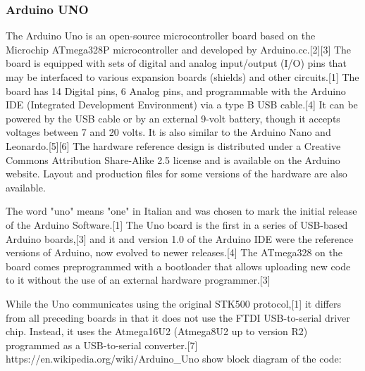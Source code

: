 \subsubsection{Arduino UNO}
The Arduino Uno is an open-source microcontroller board based on the Microchip ATmega328P 
microcontroller and developed by Arduino.cc.[2][3] The board is equipped with sets of digital 
and analog input/output (I/O) pins that may be interfaced to various expansion boards (shields) 
and other circuits.[1] The board has 14 Digital pins, 6 Analog pins, and programmable with 
the Arduino IDE (Integrated Development Environment) via a type B USB cable.[4] It can be 
powered by the USB cable or by an external 9-volt battery, though it accepts voltages between 
7 and 20 volts. It is also similar to the Arduino Nano and Leonardo.[5][6] The hardware 
reference design is distributed under a Creative Commons Attribution Share-Alike 2.5 license 
and is available on the Arduino website. Layout and production files for some versions of 
the hardware are also available.

The word "uno" means "one" in Italian and was chosen to mark the initial release of the 
Arduino Software.[1] The Uno board is the first in a series of USB-based Arduino boards,[3] 
and it and version 1.0 of the Arduino IDE were the reference versions of Arduino, now evolved 
to newer releases.[4] The ATmega328 on the board comes preprogrammed with a bootloader 
that allows uploading new code to it without the use of an external hardware programmer.[3]

While the Uno communicates using the original STK500 protocol,[1] it differs from all 
preceding boards in that it does not use the FTDI USB-to-serial driver chip. Instead, 
it uses the Atmega16U2 (Atmega8U2 up to version R2) programmed as a USB-to-serial converter.[7]
https://en.wikipedia.org/wiki/Arduino_Uno
show block diagram of the code:


